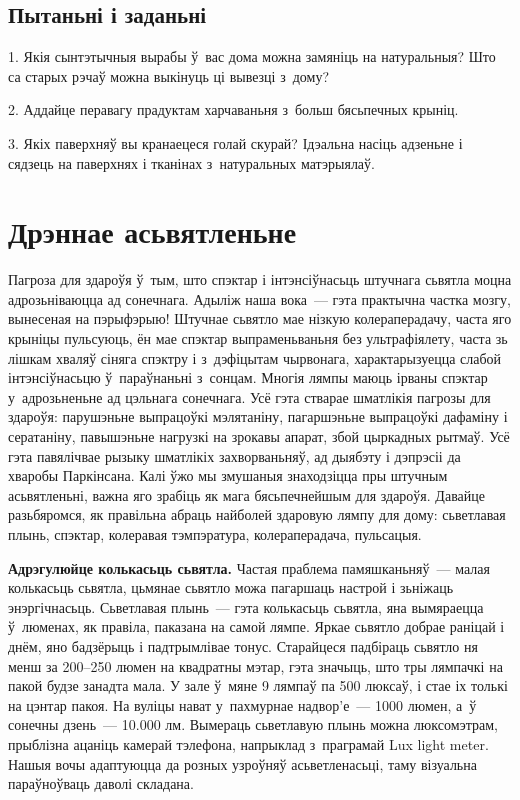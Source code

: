 \subsection*{Пытаньні і заданьні}

1. Якія сынтэтычныя вырабы ў~вас дома можна замяніць на натуральныя? Што са старых рэчаў можна выкінуць ці вывезці з~дому?

2. Аддайце перавагу прадуктам харчаваньня з~больш бясьпечных крыніц.

3. Якіх паверхняў вы кранаецеся голай скурай? Ідэальна насіць адзеньне і сядзець на паверхнях і тканінах з~натуральных матэрыялаў.


\section{Дрэннае асьвятленьне}

Пагроза для здароўя ў~тым, што спэктар і інтэнсіўнасьць штучнага сьвятла моцна адрозьніваюцца ад сонечнага. Адыліж наша вока~--- гэта практычна частка мозгу, вынесеная на пэрыфэрыю! Штучнае сьвятло мае нізкую колераперадачу, часта яго крыніцы пульсуюць, ён мае спэктар выпраменьваньня без ультрафіялету, часта зь лішкам хваляў сіняга спэктру і з~дэфіцытам чырвонага, характарызуецца слабой інтэнсіўнасьцю ў~параўнаньні з~сонцам. Многія лямпы маюць ірваны спэктар у~адрозьненьне ад цэльнага сонечнага. Усё гэта стварае шматлікія пагрозы для здароўя: парушэньне выпрацоўкі мэлятаніну, пагаршэньне выпрацоўкі дафаміну і сератаніну, павышэньне нагрузкі на зрокавы апарат, збой цыркадных рытмаў. Усё гэта павялічвае рызыку шматлікіх захворваньняў, ад дыябэту і дэпрэсіі да хваробы Паркінсана. Калі ўжо мы змушаныя знаходзіцца пры штучным асьвятленьні, важна яго зрабіць як мага бясьпечнейшым для здароўя. Давайце разьбяромся, як правільна абраць найболей здаровую лямпу для дому: сьветлавая плынь, спэктар, колеравая тэмпэратура, колераперадача, пульсацыя.

\textbf{Адрэгулюйце колькасьць сьвятла.} Частая праблема памяшканьняў~--- малая колькасьць сьвятла, цьмянае сьвятло можа пагаршаць настрой і зьніжаць энэргічнасьць. Сьветлавая плынь~--- гэта колькасьць сьвятла, яна вымяраецца ў~люменах, як правіла, паказана на самой лямпе. Яркае сьвятло добрае раніцай і днём, яно бадзёрыць і падтрымлівае тонус. Старайцеся падбіраць сьвятло ня менш за 200--250 люмен на квадратны мэтар, гэта значыць, што тры лямпачкі на пакой будзе занадта мала. У зале ў~мяне 9 лямпаў па 500 люксаў, і стае іх толькі на цэнтар пакоя. На вуліцы нават у~пахмурнае надвор'е~--- 1000 люмен, а~ў сонечны дзень~--- 10.000 лм. Вымераць сьветлавую плынь можна люксомэтрам, прыблізна ацаніць камерай тэлефона, напрыклад з~праграмай Lux light meter. Нашыя вочы адаптуюцца да розных узроўняў асьветленасьці, таму візуальна параўноўваць даволі складана.

